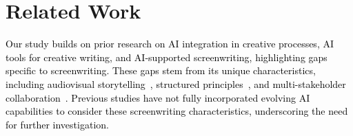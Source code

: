 \section{Related Work}
\textcolor{black}{Our study builds on prior research on AI integration in creative processes, AI tools for creative writing, and AI-supported screenwriting, highlighting gaps specific to screenwriting. These gaps stem from its unique characteristics, including audiovisual storytelling~\cite{senje2017formatting}, structured principles~\cite{mckee1997substance}, and multi-stakeholder collaboration~\cite{taylor2024one, cake2021collaborative, batty2018script}. Previous studies have not fully incorporated evolving AI capabilities to consider these screenwriting characteristics, underscoring the need for further investigation.}





